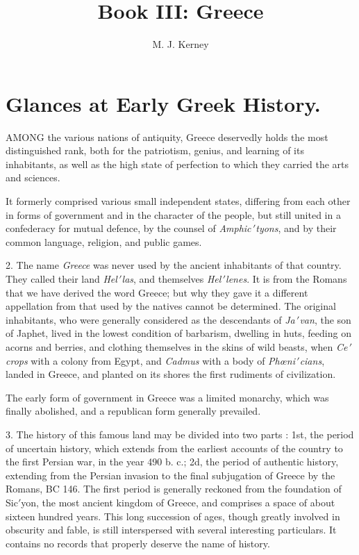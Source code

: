 \documentclass[openany,a4paper]{memoir}
\title{Book III: Greece}
\author{M. J. Kerney}
\begin{document}
\maketitle

\tableofcontents

\chapter{Glances at Early Greek History.} 

AMONG the various nations of antiquity, Greece deservedly holds the most distinguished rank, both for 
the patriotism, genius, and learning of its inhabitants, as 
well as the high state of perfection to which they carried the 
arts and sciences. 

It formerly comprised various small independent states, 
differing from each other in forms of government and in 
the character of the people, but still united in a confederacy 
for mutual defence, by the counsel of \emph{Amphic$\,'$tyons}, and by 
their common language, religion, and public games. 

2. The name \emph{Greece} was never used by the ancient inhabitants of that country. They called their land \emph{Hel$\,'$las}, and 
themselves \emph{Hel$\,'$lenes}. It is from the Romans that we have 
derived the word Greece; but why they gave it a different 
appellation from that used by the natives cannot be determined. The original inhabitants, who were generally considered as the descendants of \emph{Ja$\,'$van}, the son of Japhet, 
lived in the lowest condition of barbarism, dwelling in huts, 
feeding on acorns and berries, and clothing themselves in 
the skins of wild beasts, when \emph{Ce$\,'$crops} with a colony from 
Egypt, and \emph{Cadmus} with a body of \emph{Ph\oe ni$\,'$cians}, landed in 
Greece, and planted on its shores the first rudiments of 
civilization. 

The early form of government in Greece was a limited 
monarchy, which was finally abolished, and a republican form 
generally prevailed. 

3. The history of this famous land may be divided into 
two parts : 1st, the period of uncertain history, which extends from the earliest accounts of the country to the first 
Persian war, in the year 490 b. c.; 2d, the period of authentic 
history, extending from the Persian invasion to the final 
subjugation of Greece by the Romans, BC 146. The first 
period is generally reckoned from the foundation of Sic$'$yon, 
the most ancient kingdom of Greece, and comprises a space 
of about sixteen hundred years. This long succession of ages, 
though greatly involved in obscurity and fable, is still interspersed with several interesting particulars. It contains no 
records that properly deserve the name of history. 
\end{document}

